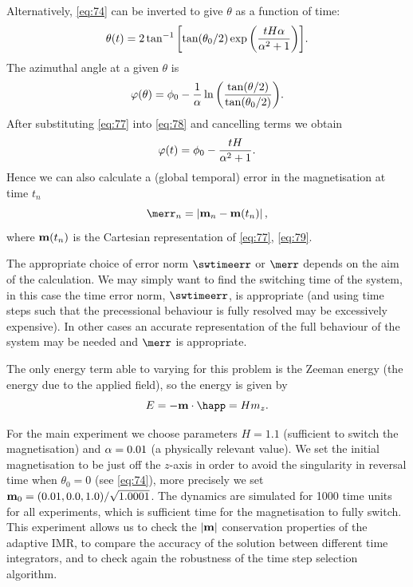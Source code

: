Alternatively, \cref{eq:74} can be inverted to give $\theta$ as a function of time:
\begin{equation}
  \theta(t) = 2 \tan^{-1} {\left[  \tan(\theta_0/2) \exp{\left( \frac{tH\alpha}{\alpha^2 + 1} \right)} \right]}.
\label{eq:77}
\end{equation}
The azimuthal angle at a given $\theta$ is \cite{Mallinson2000}
\begin{equation}
  \varphi(\theta) = \phi_0 -  \frac{1}{\alpha} \ln {\left(  \frac{\tan(\theta/2)}{\tan(\theta_0/2)}  \right)}.
\label{eq:78}
\end{equation}
After substituting \cref{eq:77} into \cref{eq:78} and cancelling terms we obtain
\begin{equation}
  \varphi(t) = \phi_0 - \frac{tH}{\alpha^2 + 1}.
  \label{eq:79}
\end{equation}
Hence we can also calculate a (global temporal) error in the magnetisation at time $t_n$
\begin{equation}
  \merr_n = \abs{\mv_n - \mv(t_n)},
\label{eq:m-sphere-error}
\end{equation}
where $\boldsymbol{\mathrm{m}}(t_n)$ is the Cartesian representation of \cref{eq:77}, \cref{eq:79}.

The appropriate choice of error norm $\swtimeerr$ or $\merr$ depends on the aim of the calculation.
We may simply want to find the switching time of the system, in this case the time error norm, $\swtimeerr$, is appropriate (and using time steps such that the precessional behaviour is fully resolved may be excessively expensive).
In other cases an accurate representation of the full behaviour of the system may be needed and $\merr$ is appropriate.

The only energy term able to varying for this problem is the Zeeman energy (the energy due to the
applied field), so the energy is given by
\begin{equation}
  E = - \mv \cdot \happ = H m_z.
\end{equation}

For the main experiment we choose parameters $H = 1.1$ (sufficient to switch the magnetisation) and $\alpha = 0.01$ (a physically relevant value).
We set the initial magnetisation to be just off the $z$-axis in order to avoid the singularity in reversal time when $\theta_0 = 0$ (see \cref{eq:74}), more precisely we set $\boldsymbol{\mathrm{m}}_0 = (0.01, 0.0, 1.0)/\sqrt{1.0001}$.
The dynamics are simulated for 1000 time units for all experiments, which is sufficient time for the magnetisation to fully switch.
This experiment allows us to check the $\left|{\boldsymbol{\mathrm{m}}} \right|$ conservation properties of the adaptive IMR, to compare the accuracy of the solution between different time integrators, and to check again the robustness of the time step selection algorithm.

